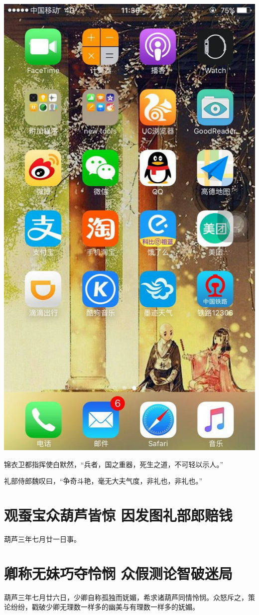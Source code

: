 \documentclass[12pt, a4paper]{book}
\begin{document}
\begin{CJK}{UTF8}{gbsn}
    \begin{center}
    \includegraphics[height=0.3\textheight]{./figure/desktop-6.jpg}
    \end{center}

    锦衣卫都指挥使白默然，“兵者，国之重器，死生之道，不可轻以示人。”

    礼部侍郎魏叹曰，“争奇斗艳，毫无大夫气度，非礼也，非礼也。”

    \chapter{观蚕宝众葫芦皆惊 因发图礼部郎赔钱}
    
    葫芦三年七月廿一日事。
    
    \chapter{卿称无妹巧夺怜悯 众假测论智破迷局}
    
    葫芦三年七月廿六日，少卿自称孤独而妩媚，希求诸葫芦同情怜悯。众怒斥之，策论纷纷，戳破少卿无理数一样多的幽美与有理数一样多的妩媚。

    \appendix

    

\end{CJK}
\end{document}
